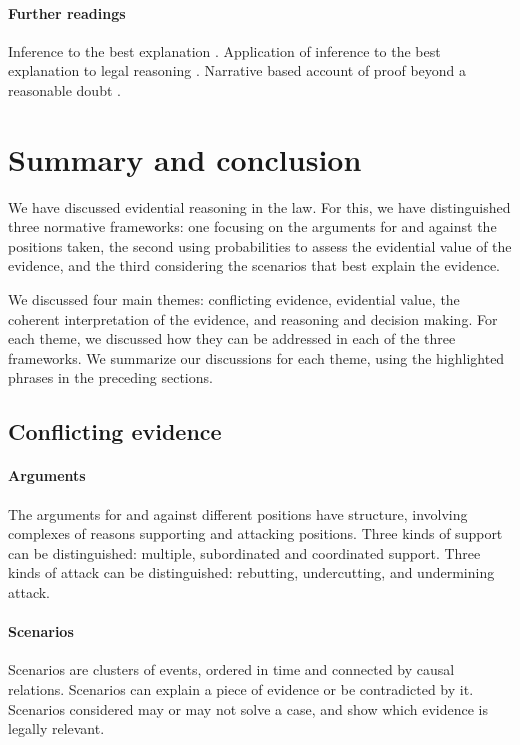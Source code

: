 \documentclass[10pt]{article}
\begin{document}
\paragraph{Further readings}

Inference to the best explanation \citep{lipton1991}.
Application of inference to the best explanation 
to legal reasoning \citep{pardoAllen2008}. 
Narrative based account of proof beyond a 
reasonable doubt \citep{allen2010, allenStein2013}.
















\section{Summary and conclusion}

We have discussed evidential reasoning in the law. For this, we have distinguished three normative frameworks: one focusing on the arguments for and against the positions taken, the second using probabilities to assess the evidential value of the evidence, and the third considering the scenarios that best explain the evidence. 

We discussed four main themes: conflicting evidence, evidential value, the coherent interpretation of the evidence, and reasoning and decision making. For each theme, we discussed how they can be addressed in each of the three frameworks. We summarize our discussions for each theme, using the highlighted phrases in the preceding sections.

\subsection*{Conflicting evidence}

\paragraph{Arguments}
	The arguments for and against different positions have structure, involving complexes of reasons supporting and attacking positions.
	Three kinds of support can be distinguished: multiple, subordinated and coordinated support.
	Three kinds of attack can be distinguished: rebutting, undercutting, and undermining attack.

\paragraph{Scenarios}
	Scenarios are clusters of events, ordered in time and connected by causal relations.
	Scenarios can explain a piece of evidence or be contradicted by it.
	Scenarios considered may or may not solve a case, and show which evidence is legally relevant.
\end{document}
